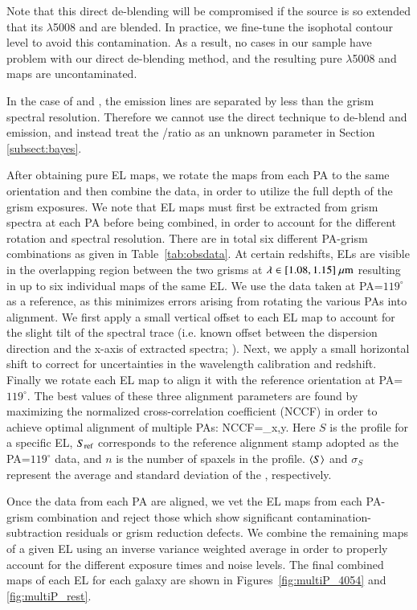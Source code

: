 Note that this direct de-blending will be compromised if the source is so extended that its
\OIII$\lambda$5008 and \Hb are blended. In practice, we fine-tune the isophotal contour level
to avoid this contamination. As a result, no cases in our sample have problem with our
direct de-blending method, and the resulting pure \OIII$\lambda$5008 and \Hb maps are
uncontaminated.

In the case of \Ha and \NII, the emission lines are separated by less than the grism spectral
resolution. Therefore we cannot use the direct technique to de-blend \Ha and \NII
emission, and instead treat the \NII/\Ha ratio as an unknown parameter in Section
\ref{subsect:bayes}.

After obtaining pure EL maps, we rotate the maps from each PA to the same orientation and then combine the data, in order 
to utilize the full depth of the grism exposures. We note that EL maps must first be extracted from grism spectra at each PA 
before being combined, in order to account for the different rotation and spectral resolution.
There are in total six different PA-grism combinations as given in Table~\ref{tab:obsdata}. At certain redshifts, ELs are
visible in the overlapping region between the two grisms at $\lambda\in[1.08,1.15]~\mu\textrm{m}$
resulting in up to six individual maps of the same EL. We use the data taken at
PA=$119^{\circ}$ as a reference, as this minimizes errors arising from rotating the various
PAs into alignment. We first apply a small vertical offset to each EL map to account for the
slight tilt of the spectral trace (i.e. known offset between the dispersion direction and the
x-axis of extracted spectra; \citealt{Brammer:2012bu}). Next, we apply a small horizontal
shift to correct for uncertainties in the wavelength calibration and redshift. Finally we
rotate each EL map to align it with the reference orientation at PA=$119^{\circ}$.  The best
values of these three alignment parameters are found by maximizing the normalized
cross-correlation coefficient (NCCF) in order to achieve optimal alignment of multiple PAs:
\be\label{eq:ccf}
    \textrm{NCCF}=\Sigma_{x,y}.
\ee
Here $S$ is the \subr profile for a specific EL, $S_{\textrm{ref}}$ corresponds to the reference
alignment stamp adopted as the PA=$119^{\circ}$ data, and $n$ is the number of spaxels in the
\subr profile. $\left<S\right>$ and $\sigma_S$ represent the average and standard deviation of the
\subr, respectively.

Once the data from each PA are aligned, we vet the EL maps from each PA-grism combination and
reject those which show significant contamination-subtraction residuals or grism reduction defects.  We
combine the remaining maps of a given EL using an inverse variance weighted average
in order to properly account for the different exposure times and noise levels.
The final combined maps of each EL for each galaxy are shown in Figures~\ref{fig:multiP_4054} and
\ref{fig:multiP_rest}.

